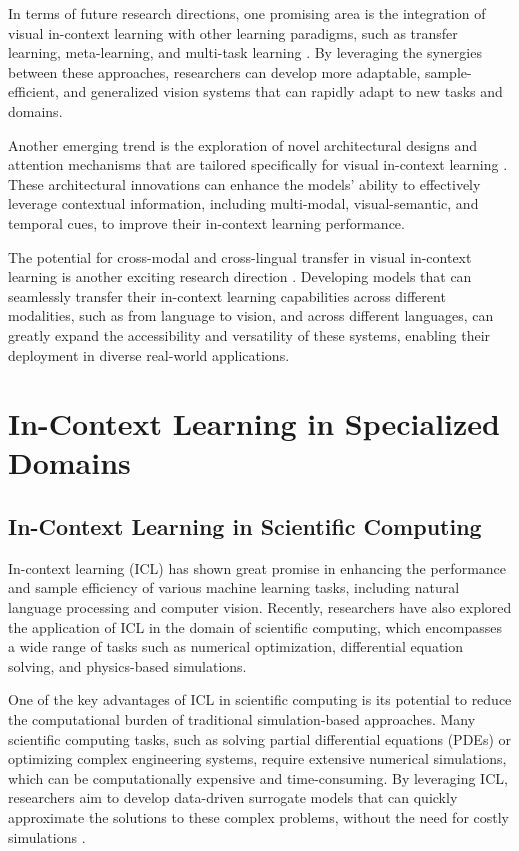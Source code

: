 \documentclass[11pt]{article}
\begin{document}
In terms of future research directions, one promising area is the integration of visual in-context learning with other learning paradigms, such as transfer learning, meta-learning, and multi-task learning \cite{ref232}. By leveraging the synergies between these approaches, researchers can develop more adaptable, sample-efficient, and generalized vision systems that can rapidly adapt to new tasks and domains.

Another emerging trend is the exploration of novel architectural designs and attention mechanisms that are tailored specifically for visual in-context learning \cite{ref247,ref261}. These architectural innovations can enhance the models' ability to effectively leverage contextual information, including multi-modal, visual-semantic, and temporal cues, to improve their in-context learning performance.

The potential for cross-modal and cross-lingual transfer in visual in-context learning is another exciting research direction \cite{ref232}. Developing models that can seamlessly transfer their in-context learning capabilities across different modalities, such as from language to vision, and across different languages, can greatly expand the accessibility and versatility of these systems, enabling their deployment in diverse real-world applications.

\section{In-Context Learning in Specialized Domains}

\subsection{In-Context Learning in Scientific Computing}

In-context learning (ICL) has shown great promise in enhancing the performance and sample efficiency of various machine learning tasks, including natural language processing and computer vision. Recently, researchers have also explored the application of ICL in the domain of scientific computing, which encompasses a wide range of tasks such as numerical optimization, differential equation solving, and physics-based simulations.

One of the key advantages of ICL in scientific computing is its potential to reduce the computational burden of traditional simulation-based approaches. Many scientific computing tasks, such as solving partial differential equations (PDEs) or optimizing complex engineering systems, require extensive numerical simulations, which can be computationally expensive and time-consuming. By leveraging ICL, researchers aim to develop data-driven surrogate models that can quickly approximate the solutions to these complex problems, without the need for costly simulations \cite{ref262}.
\end{document}
